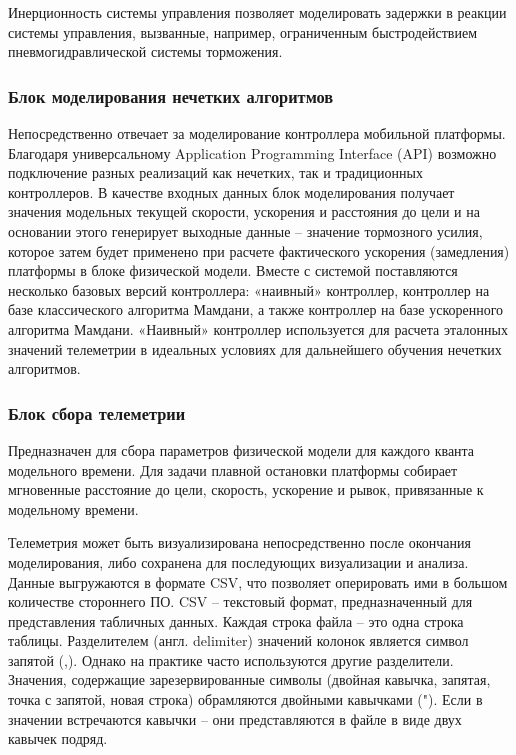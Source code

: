 Инерционность системы управления позволяет моделировать задержки в реакции системы управления, вызванные, например, ограниченным быстродействием пневмогидравлической системы торможения.

\subsubsection{Блок моделирования нечетких алгоритмов}

Непосредственно отвечает за моделирование контроллера мобильной платформы. Благодаря универсальному Application Programming Interface (API) возможно подключение разных реализаций как нечетких, так и традиционных контроллеров. В качестве входных данных блок моделирования получает значения модельных текущей скорости, ускорения и расстояния до цели и на основании этого генерирует выходные данные – значение тормозного усилия, которое затем будет применено при расчете фактического ускорения (замедления) платформы в блоке физической модели. Вместе с системой поставляются несколько базовых версий контроллера: «наивный» контроллер, контроллер на базе классического алгоритма Мамдани, а также контроллер на базе ускоренного алгоритма Мамдани. «Наивный» контроллер используется для расчета эталонных значений телеметрии в идеальных условиях для дальнейшего обучения нечетких алгоритмов.

\subsubsection{Блок сбора телеметрии }

Предназначен для сбора параметров физической модели для каждого кванта модельного времени. Для задачи плавной остановки платформы собирает мгновенные расстояние до цели, скорость, ускорение и рывок, привязанные к модельному времени.

Телеметрия может быть визуализирована непосредственно после окончания моделирования, либо сохранена для последующих визуализации и анализа. Данные выгружаются в формате CSV, что позволяет оперировать ими в большом количестве стороннего ПО. CSV – текстовый формат, предназначенный для представления табличных данных. Каждая строка файла – это одна строка таблицы. Разделителем (англ. delimiter) значений колонок является символ запятой (,). Однако на практике часто используются другие разделители. Значения, содержащие зарезервированные символы (двойная кавычка, запятая, точка с запятой, новая строка) обрамляются двойными кавычками ("). Если в значении встречаются кавычки – они представляются в файле в виде двух кавычек подряд.
